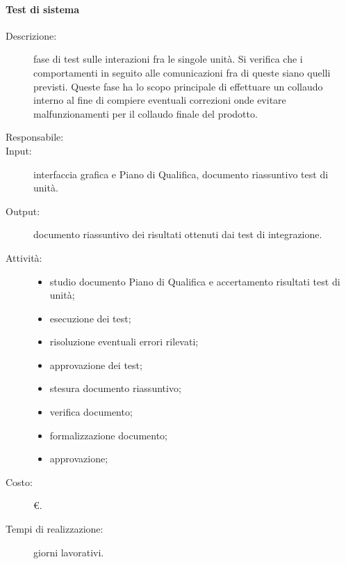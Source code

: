 \paragraph{Test di sistema}
\begin{description}
\item[Descrizione:] fase di test sulle interazioni fra le singole unità. Si verifica che i comportamenti in seguito alle comunicazioni fra di queste siano quelli previsti. Queste fase ha lo scopo principale di effettuare un collaudo interno al fine di compiere eventuali correzioni onde evitare malfunzionamenti per il collaudo finale del prodotto.
\item[Responsabile:] 
\item[Input:] interfaccia grafica e Piano di Qualifica, documento riassuntivo test di unità.
\item[Output:] documento riassuntivo dei risultati ottenuti dai test di integrazione.
\item[Attività:]
\begin{itemize}
\item studio documento Piano di Qualifica e accertamento risultati test di unità;
\item esecuzione dei test;
\item risoluzione eventuali errori rilevati;
\item approvazione dei test;
\item stesura documento riassuntivo;
\item verifica documento;
\item formalizzazione documento;
\item approvazione;
\end{itemize}
\item[Costo:] \euro{}.
\item[Tempi di realizzazione:]  giorni lavorativi.
\end{description}

